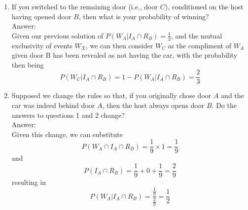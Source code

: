 \documentclass{article}
\begin{document}
\begin{enumerate}
\begin{enumerate}
        \clearpage
        \item If you switched to the remaining door (i.e., door $C$), conditioned on the host having opened door $B$, then what is your probability of winning?
            \\ Answer: \\
            Given our previous solution of $ P(W_A | I_A \cap R_B) = \frac{1}{3} $, and the mutual exclusivity of events $W_X$, we can then consider $W_C$ as the compliment of $W_A$ given door B has been revealed as not having the car, with the probability then being 
            $$ P(W_C | I_A \cap R_B) = 1 - P(W_A | I_A \cap R_B) = \boxed{\frac{2}{3}} $$
        \clearpage
        \item Supposed we change the rules so that, if you originally chose door $A$ and the car was indeed behind door $A$, then the host always opens door $B$. Do the answers to questions 1 and 2 change?
            \\ Answer: \\
            Given this change, we can substitute 
            $$ P(W_A \cap I_A \cap R_B) = \frac{1}{9} \times 1 = \frac{1}{9} $$ 
            and
            $$ P(I_A \cap R_B) = \frac{1}{9} + 0 + \frac{1}{9} = \frac{2}{9} $$
            resulting in
            $$ P(W_A | I_A \cap R_B) = \frac{\frac{1}{9}}{\frac{2}{9}} = \boxed{\frac{1}{2}} $$
    \end{enumerate}
\end{enumerate}
\end{document}
